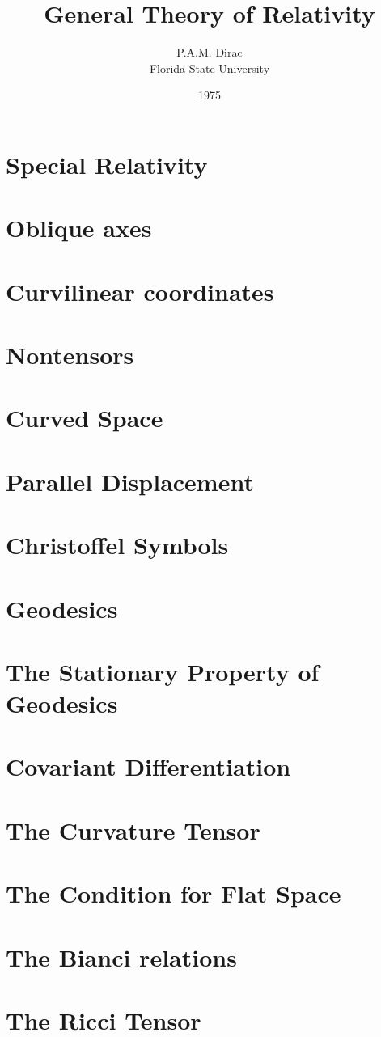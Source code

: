 \documentclass[10pt]{article}
\title{General Theory of Relativity}
\author{P.A.M. Dirac\\Florida State University}
\date{1975}
\numberwithin{equation}{section}
\begin{document}
\maketitle
\section{Special Relativity}

\section{Oblique axes}

\section{Curvilinear coordinates}

\section{Nontensors}

\section{Curved Space}

\section{Parallel Displacement}

\section{Christoffel Symbols}

\section{Geodesics}

\section{The Stationary Property of Geodesics}

\section{Covariant Differentiation}

\section{The Curvature Tensor}

\section{The Condition for Flat Space}

\section{The Bianci relations}

\section{The Ricci Tensor}

\end{document}
